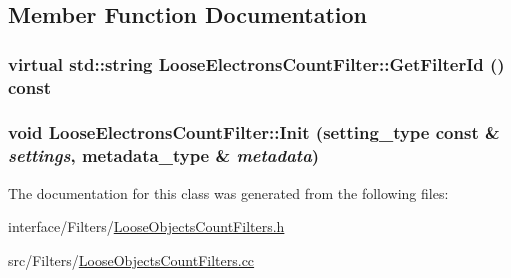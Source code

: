 \subsection{Member Function Documentation}
\hypertarget{classLooseElectronsCountFilter_a44f431ff35de350eee4c35bdf2c65ca8}{
\subsubsection[{GetFilterId}]{\setlength{\rightskip}{0pt plus 5cm}virtual std::string LooseElectronsCountFilter::GetFilterId () const}}
\label{classLooseElectronsCountFilter_a44f431ff35de350eee4c35bdf2c65ca8}
\hypertarget{classLooseElectronsCountFilter_ac1b0f92669ffa2c61805d4fe3a5c124c}{
\subsubsection[{Init}]{\setlength{\rightskip}{0pt plus 5cm}void LooseElectronsCountFilter::Init (setting\_\-type const \& {\em settings}, \/  metadata\_\-type \& {\em metadata})}}
\label{classLooseElectronsCountFilter_ac1b0f92669ffa2c61805d4fe3a5c124c}


The documentation for this class was generated from the following files:\begin{DoxyCompactItemize}
\item 
interface/Filters/\hyperlink{LooseObjectsCountFilters_8h}{LooseObjectsCountFilters.h}\item 
src/Filters/\hyperlink{LooseObjectsCountFilters_8cc}{LooseObjectsCountFilters.cc}\end{DoxyCompactItemize}

